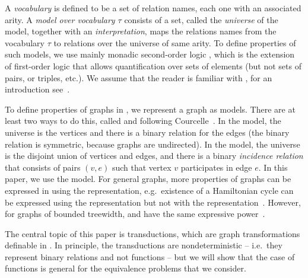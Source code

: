     A  \emph{vocabulary} is defined to be  a set of relation names, each one with an associated arity. A \emph{model over vocabulary $\tau$} consists of a set, called the \emph{universe} of the model, together with an \emph{interpretation}, maps the relations names from the vocabulary $\tau$ to  relations over the universe of same arity. To define properties of such models, we use mainly monadic second-order logic \mso, which  is the extension of first-order logic that allows quantification over sets of elements (but not sets of pairs, or triples, etc.). We assume that the reader is familiar with \mso, for an introduction see~\cite[Section 2]{Thomas97}.
     
     
      To define properties of graphs in \mso, we represent a graph as models. There are at least two ways to do this, called  \msoone and \msotwo following 
 Courcelle~\cite[Definition 1.7]{courcelleVI}. In the \msoone model, the  universe is the vertices and there is a binary relation for the edges (the binary relation is symmetric, because graphs are undirected). In the \msotwo model, the universe is the disjoint union of vertices and edges, and there is a binary  \emph{incidence relation} that consists of pairs $(v,e)$ such that vertex $v$ participates in edge $e$. 
In this paper, we use the \msotwo model. For general graphs, more properties of graphs can be expressed in \mso using the \msotwo representation, e.g.~existence of a Hamiltonian cycle can be expressed using the \msotwo representation but not with the \msoone representation~\cite[p.~118]{courcelleVI}. However, for graphs of bounded treewidth, \msoone and \msotwo have the same expressive power~\cite[Theorem 9.37]{courcelleGraphStructureMonadic2012}. 

  The central topic of this paper is \mso transductions, which are graph transformations definable in \mso. In principle, the transductions are nondeterministic -- i.e.~they represent binary relations and not functions -- but we will show that the case of functions is general for the equivalence problems that we consider.

